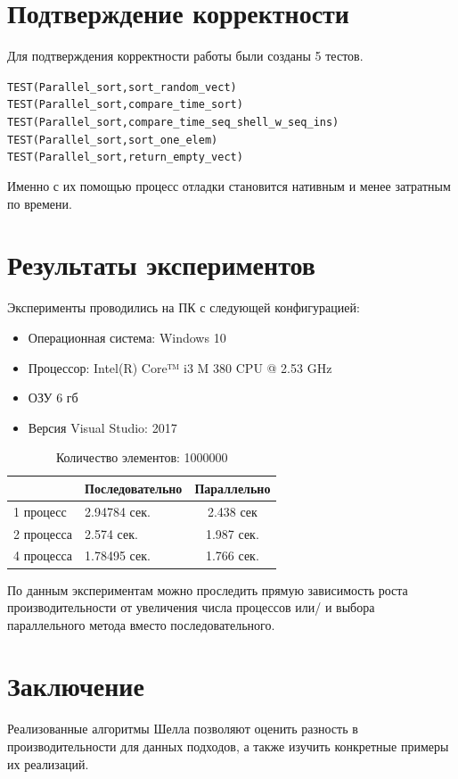 \documentclass[12pt, letterpaper]{report}
\begin{document}
\chapter*{Подтверждение корректности}
Для подтверждения корректности работы были созданы 5 тестов.
\begin{alltt}
TEST(Parallel_sort, sort_random_vect) {}
TEST(Parallel_sort, compare_time_sort) {}
TEST(Parallel_sort, compare_time_seq_shell_w_seq_ins) {}
TEST(Parallel_sort, sort_one_elem) {}
TEST(Parallel_sort, return_empty_vect) {}
\end{alltt}
Именно с их помощью процесс отладки становится нативным и менее затратным по
времени.
\chapter*{Результаты экспериментов}
Эксперименты проводились на ПК с следующей конфигурацией:
\begin{itemize}
\item Операционная система: Windows 10
\item Процессор: Intel(R) Core™ i3 M 380 CPU @ 2.53 GHz
\item ОЗУ 6 гб
\item Версия Visual Studio: 2017
\end{itemize}
\begin{table}[h]
  \caption{Количество элементов: 1000000}
  \centering
\begin{tabular}{ || l | l | c || }
\hline
 & Последовательно  & Параллельно  \\ \hline
1 процесс & 2.94784 сек. & 2.438 сек \\ \hline
2 процесса & 2.574 сек. & 1.987 сек.  \\ \hline
4 процесса & 1.78495 сек. & 1.766 сек. \\
\hline
\end{tabular}
\label{table:performance}
\end{table}

По данным экспериментам можно проследить прямую зависимость роста
производительности от увеличения числа процессов или/ и выбора параллельного
метода вместо последовательного.
\chapter*{Заключение}
Реализованные алгоритмы Шелла позволяют оценить разность в производительности
для данных подходов, а также изучить конкретные примеры их реализаций.
\end{document}
